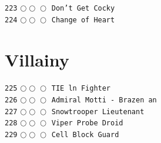 \documentclass[a4paper,landscape]{article}
\begin{document}
\begin{multicols*}{5}
\texttt{223} \(\bigcirc\!\bigcirc\!\bigcirc\)  \texttt{Don't Get Cocky} \vspace{-0.3mm}\\ 
\texttt{224} \(\bigcirc\!\bigcirc\!\bigcirc\)  \texttt{Change of Heart} \vspace{-0.3mm}\\ 
\section{Villainy} 
\vspace{-2mm} 
\texttt{225} \(\bigcirc\!\bigcirc\!\bigcirc\)  \texttt{TIE ln Fighter} \vspace{-0.3mm}\\ 
\texttt{226} \(\bigcirc\!\bigcirc\!\bigcirc\)  \texttt{Admiral Motti - Brazen an} \vspace{-0.3mm}\\ 
\texttt{227} \(\bigcirc\!\bigcirc\!\bigcirc\)  \texttt{Snowtrooper Lieutenant} \vspace{-0.3mm}\\ 
\texttt{228} \(\bigcirc\!\bigcirc\!\bigcirc\)  \texttt{Viper Probe Droid} \vspace{-0.3mm}\\ 
\texttt{229} \(\bigcirc\!\bigcirc\!\bigcirc\)  \texttt{Cell Block Guard} \vspace{-0.3mm}\\ 

\end{multicols*}
\end{document}
